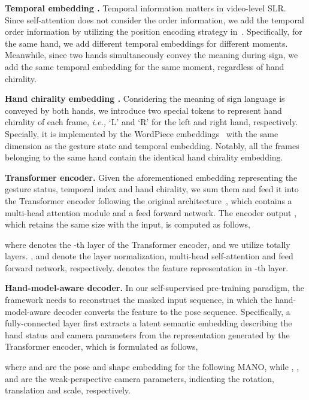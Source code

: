 \documentclass[10pt,twocolumn,letterpaper]{article}
\begin{document}
\noindent \textbf{Temporal embedding .}
Temporal information matters in video-level SLR.
Since self-attention does not consider the order information, we add the temporal order information by utilizing the position encoding strategy in~\cite{vaswani2017attention}.
Specifically, for the same hand, we add different temporal embeddings for different moments.
Meanwhile, since two hands simultaneously convey the meaning during sign, we add the same temporal embedding for the same moment, regardless of hand chirality.


\noindent \textbf{Hand chirality embedding .}
Considering the meaning of sign language is conveyed by both hands, we introduce two special tokens to represent hand chirality of each frame, \emph{i.e.,} `L' and `R' for the left and right hand, respectively.
Specially, it is implemented by the WordPiece embeddings~\cite{wu2016google} with the same dimension as the gesture state and temporal embedding.
Notably, all the frames belonging to the same hand contain the identical hand chirality embedding.



\noindent \textbf{Transformer encoder.}
Given the aforementioned embedding representing the gesture status, temporal index and hand chirality, we sum them and feed it into the Transformer encoder following the original architecture~\cite{vaswani2017attention}, which contains a multi-head attention module and a feed forward network.
The encoder output , which retains the same size with the input, is computed as follows,

where  denotes the -th layer of the Transformer encoder, and we utilize totally  layers. 
,  and  denote the layer normalization, multi-head self-attention and feed forward network, respectively.
 denotes the feature representation in -th layer.

\noindent \textbf{Hand-model-aware decoder.}
In our self-supervised pre-training paradigm, the framework needs to reconstruct the masked input sequence, in which the hand-model-aware decoder converts the feature to the pose sequence.
Specifically, a fully-connected layer  first extracts a latent semantic embedding describing the hand status and camera parameters from the representation generated by the Transformer encoder, which is formulated as follows,
 
where  and  are the pose and shape embedding for the following MANO, while , , and  are the weak-perspective camera parameters, indicating the rotation, translation and scale, respectively.
\end{document}
